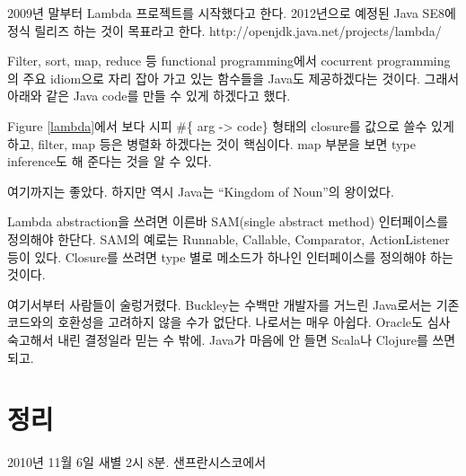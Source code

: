 \documentclass[a4paper]{article}
\begin{document}
2009년 말부터 Lambda 프로젝트를 시작했다고 한다. 2012년으로 예정된
Java SE8에 정식 릴리즈 하는 것이 목표라고 한다.
http://openjdk.java.net/projects/lambda/
 
Filter, sort, map, reduce 등 functional programming에서 cocurrent
programming의 주요 idiom으로 자리 잡아 가고 있는 함수들을 Java도
제공하겠다는 것이다. 그래서 아래와 같은 Java code를 만들 수 있게
하겠다고 했다.
 
Figure \ref{lambda}에서 보다 시피 \#\{ arg -> code\} 형태의 closure를 값으로 
쓸수 있게 하고, filter, map 등은 병렬화 하겠다는 것이 핵심이다. 
map 부분을 보면 type inference도 해 준다는 것을 알 수 있다.
 
여기까지는 좋았다. 하지만 역시 Java는 ``Kingdom of Noun''의 왕이었다.
 
Lambda abstraction을 쓰려면 이른바 SAM(single abstract method)
인터페이스를 정의해야 한단다.  SAM의 예로는 Runnable, Callable,
Comparator, ActionListener 등이 있다. Closure를 쓰려면 type 별로
메소드가 하나인 인터페이스를 정의해야 하는 것이다.
 
여기서부터 사람들이 술렁거렸다. Buckley는 수백만 개발자를 거느린
Java로서는 기존 코드와의 호환성을 고려하지 않을 수가 없단다. 나로서는
매우 아쉽다. Oracle도 심사 숙고해서 내린 결정일라 믿는 수 밖에. Java가
마음에 안 들면 Scala나 Clojure를 쓰면 되고.

\section{정리}

2010년 11월 6일 새별 2시 8분.
샌프란시스코에서
\end{document}
